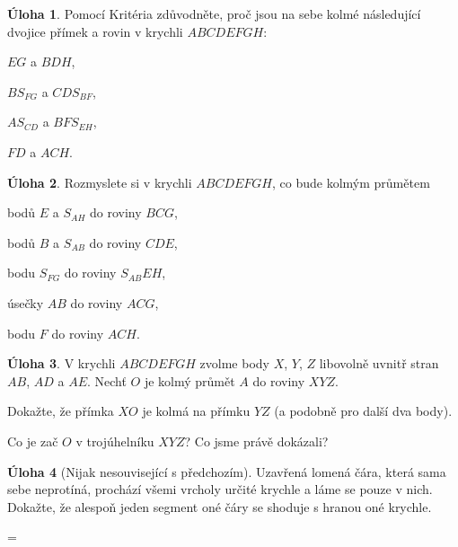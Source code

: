 \documentclass[8pt,a5paper]{extarticle}
\theoremstyle{definition}
\newtheorem{uloha}{Úloha}
\newtheorem{suloha}[uloha]{\llap{$\star$ }Úloha}
\def\vysld{}
\let\printvysl\relax
\begin{document}
\begin{uloha}
Pomocí Kritéria zdůvodněte, proč jsou na sebe kolmé následující dvojice přímek a rovin v krychli $ABCDEFGH$:
\begin{enumerate*}
    \item $EG$ a $BDH$,
    \item $BS_{FG}$ a $CDS_{BF}$,
    \item $AS_{CD}$ a $BFS_{EH}$,
    \item $FD$ a $ACH$.
\end{enumerate*}
\end{uloha}




\begin{uloha}
Rozmyslete si v krychli $ABCDEFGH$, co bude kolmým průmětem
\begin{enumerate*}
    \item bodů $E$ a $S_{AH}$ do roviny $BCG$,
    \item bodů $B$ a $S_{AB}$ do roviny $CDE$,
    \item bodu $S_{FG}$ do roviny $S_{AB}EH$,
    \item úsečky $AB$ do roviny $ACG$,
    \item bodu $F$ do roviny $ACH$.
\end{enumerate*}
\end{uloha}


\begin{suloha}
V krychli $ABCDEFGH$ zvolme body $X$, $Y$, $Z$ libovolně uvnitř stran $AB$, $AD$ a $AE$. Nechť $O$ je kolmý průmět $A$ do roviny $XYZ$.
\begin{enumerate*}
    \item Dokažte, že přímka $XO$ je kolmá na přímku $YZ$ (a podobně pro další dva body).
    \item Co je zač $O$ v trojúhelníku $XYZ$? Co jsme právě dokázali?
\end{enumerate*}
\end{suloha}


\begin{suloha}[Nijak nesouvisející s předchozím]
Uzavřená lomená čára, která sama sebe neprotíná, prochází všemi vrcholy určité krychle a láme se pouze v nich. Dokažte, že alespoň jeden segment oné čáry se shoduje s hranou oné krychle.
\end{suloha}


\newpage
\parindent=0pt
\parskip=\smallskipamount
\def\printvysl#1#2{\textbf{#1.}\ #2\par}
\vysld
\end{document}
